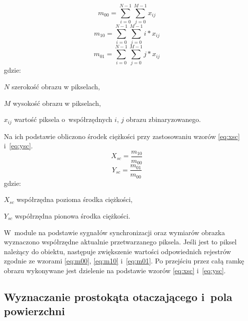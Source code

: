\begin{equation}
\label{eq:m00}
m_{00}=\sum_{i=0}^{N-1}\sum_{j=0}^{M-1} x_{ij}
\end{equation}
\begin{equation}
\label{eq:m10}
m_{10}=\sum_{i=0}^{N-1}\sum_{j=0}^{M-1} i*x_{ij}
\end{equation}
\begin{equation}
\label{eq:m01}
m_{01}=\sum_{i=0}^{N-1}\sum_{j=0}^{M-1} j*x_{ij}
\end{equation}
gdzie:
\begin{eqwhere}[2cm]
	\item[$N$] szerokość obrazu w pikselach,
	\item[$M$] wysokość obrazu w pikselach,
	\item[$x_{ij}$] wartość piksela o~współrzędnych $i$, $j$ obrazu zbinaryzowanego.
\end{eqwhere}
Na ich podstawie obliczono środek ciężkości przy zastosowaniu wzorów \eqref{eq:xsc} i~\eqref{eq:ysc}.
\begin{equation}
\label{eq:xsc}
X_{sc}=\frac{m_{10}}{m_{00}}
\end{equation}
\begin{equation}
\label{eq:ysc}
Y_{sc}=\frac{m_{01}}{m_{00}}
\end{equation}
gdzie:
\begin{eqwhere}[2cm]
	\item[$X_{sc}$] współrzędna pozioma środka ciężkości,
	\item[$Y_{sc}$] współrzędna pionowa środka ciężkości.
\end{eqwhere}

W~module na podstawie sygnałów synchronizacji oraz wymiarów obrazka wyznaczono współrzędne aktualnie przetwarzanego piksela. 
Jeśli jest to piksel należący do obiektu, następuje zwiększenie wartości odpowiednich rejestrów zgodnie ze wzorami
\ref{eq:m00}, \ref{eq:m10} i~\ref{eq:m01}. 
Po przejściu przez całą ramkę obrazu wykonywane jest dzielenie na podstawie wzorów \ref{eq:xsc} i~\ref{eq:ysc}.

\subsection{Wyznaczanie prostokąta otaczającego i~pola powierzchni}
\label{subsec:prostokat_otaczajacy}

